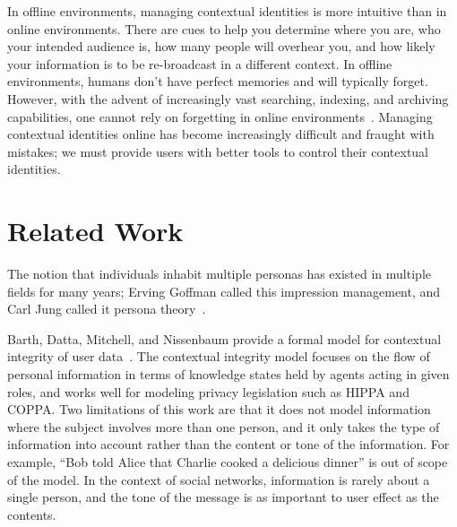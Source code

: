\documentclass[10pt, conference, compsocconf]{IEEEtran}
\begin{document}
\begin{comment}
zuckerberg on "having multiple identities is dishonest"
http://books.google.ca/books?id=RRUkLhyGZVgC&pg=PA199&lpg=PA199&dq=%
\end{comment}

In offline environments, managing contextual identities is more intuitive than
in online environments. There are cues to help you determine where you are,
who your intended audience is, how many people will overhear you, and how
likely your information is to be re-broadcast in a different context. 
In offline environments, humans don't have perfect memories and
will typically forget.  However, with the advent of increasingly vast
searching, indexing, and archiving capabilities, one cannot rely on forgetting
in online environments~\cite{delete}. Managing contextual identities
online has become increasingly difficult and fraught with mistakes; we must
provide users with better tools to control their contextual identities.

\section{Related Work}

The notion that individuals inhabit multiple personas has existed in multiple
fields for many years; Erving Goffman called this impression management, and
Carl Jung called it persona theory~\cite{goffman,jung}.

Barth, Datta, Mitchell, and Nissenbaum provide a formal model for contextual
integrity of user data~\cite{barth}. The contextual integrity model focuses on
the flow of personal information in terms of knowledge states held by agents
acting in given roles, and works well for modeling privacy legislation such as
HIPPA and COPPA. Two limitations of this work are that it does not
model information where the subject involves more than one person, and it
only takes the type of information into account rather than the content or tone
of the information. For example, ``Bob told Alice that Charlie cooked a
delicious dinner'' is out of scope of the model.  In the context of social
networks, information is rarely about a single person, and the tone of the
message is as important to user effect as the contents.
\end{document}
